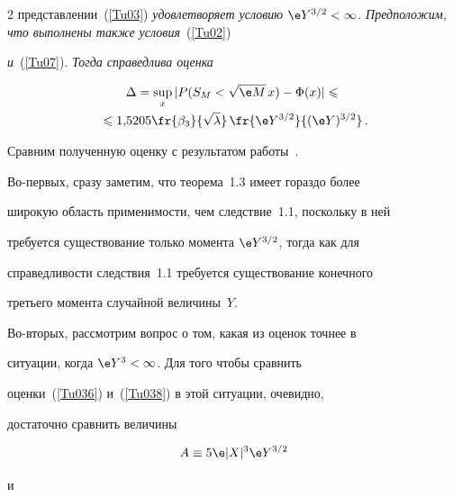 \begin{multicols}{2}
{представлении}~(\ref{Tu03}) \textit{удов\-ле\-тво\-ря\-ет условию $\e


Y^{3/2}<\infty$. Предположим, что выполнены также условия}~(\ref{Tu02}) 


\textit{и}~(\ref{Tu07}). \textit{Тогда справедлива оценка}


\begin{multline}


 \Delta = \sup\limits_{x}|P(S_{M}<\sqrt{\e


M}\,x)-\Phi(x)| \leqslant{}\\


{}\leqslant


1{,}5205\fr{\beta_3}{\sqrt{\lambda}}\,\fr{\e


Y^{3/2}}{(\e Y)^{3/2}}\,.


\label{Tu036}


\end{multline}













Сравним полученную оценку с результатом работы~\cite{5g}.


Во-пер\-вых, сразу заметим, что теорема~1.3 имеет гораздо более


широкую область при\-ме\-ни\-мости, чем следствие~1.1, поскольку в ней


требуется существование только момента $\e Y^{3/2}$, тогда как для


справедливости следствия~1.1 требуется существование конечного


третьего момента случайной величины~$Y$.





Во-вто\-рых, рассмотрим вопрос о том, какая из оценок точнее в


ситуации, когда $\e Y^{3} < \infty$. Для того чтобы сравнить


оценки~(\ref{Tu036}) и~(\ref{Tu038}) в этой ситуации, очевидно,


достаточно сравнить величины


$$


A \equiv 5\e|X|^3 \e Y^{3/2}


$$


и


\begin{multline*}



\end{multline*}
\end{multicols}
